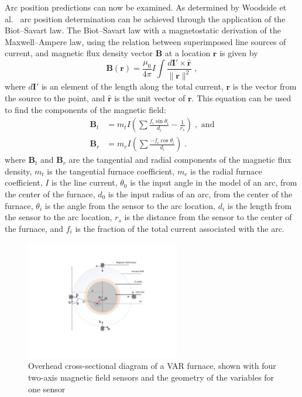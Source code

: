 \documentclass[onehalf,11pt]{beavtex}
\begin{document}
Arc position predictions can now be examined.
As determined by Woodside et al.~\cite{Woodside:2013cf} arc position determination can be achieved through the application of the Biot--Savart law. 
The Biot--Savart law with a magnetostatic derivation of the Maxwell--Ampere law, using the relation between superimposed line sources of current, and magnetic flux density vector $\mathbf{B}$ at a location $\mathbf{r}$ is given by
\begin{equation}
\mathbf{B}(\mathbf{r}) = \frac{\mu_0}{4 \pi} I \int \frac{d \mathbf{I}' \times \mathbf{\hat{r}}}{ \| \mathbf{r} \|^2 } \;,
\end{equation}
where $d \mathbf{I}'$ is an element of the length along the total current, $\mathbf{r}$ is the vector from the source to the point, and $\mathbf{\hat{r}}$ is the unit vector of $\mathbf{r}$.
This equation can be used to find the components of the magnetic field:
\begin{align}
\mathbf{B}_t &= m_t I \left( \sum \frac{f_i \sin \theta_i}{d_i} - \frac{1}{r_s} \right) \;, \text{ and} \label{eq:magnetic_t} \\
\mathbf{B}_r &= m_r I \left( \sum \frac{-f_i \cos \theta_i}{d_i} \right) \;. \label{eq:magnetic_r}
\end{align}
where $\mathbf{B}_t$ and $\mathbf{B}_r$ are the tangential and radial components of the magnetic flux density, $m_t$ is the tangential furnace coefficient, $m_r$ is the radial furnace coefficient, $I$ is the line current, $\theta_0$ is the input angle in the model of an arc, from the center of the furnace, $d_0$ is the input radius of an arc, from the center of the furnace, $\theta_i$ is the angle from the sensor to the arc location, $d_i$ is the length from the sensor to the arc location, $r_s$ is the distance from the sensor to the center of the furnace, and $f_i$ is the fraction of the total current associated with the arc.

\begin{figure}[htbp]
\centering
	\includegraphics[width=0.6\textwidth]{diagram1.pdf}
	\caption{Overhead cross-sectional diagram of a VAR furnace, shown with four two-axis magnetic field sensors and the geometry of the variables for one sensor}
	\label{fig:cross_section}
\end{figure}
\end{document}
